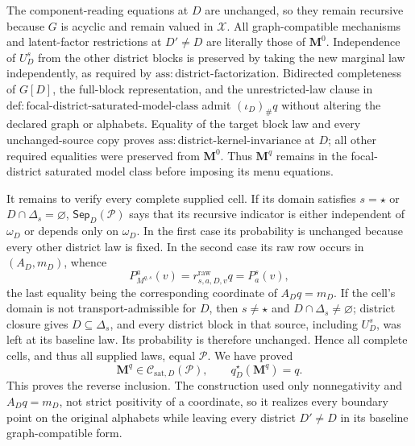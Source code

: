 The component-reading equations at \(D\) are unchanged, so they remain recursive because \(G\) is acyclic and remain valued in \(\mathcal X\).  All graph-compatible mechanisms and latent-factor restrictions at \(D'\ne D\) are literally those of \(\mathbf M^0\).  Independence of \(U_D^s\) from the other district blocks is preserved by taking the new marginal law independently, as required by \(\mathrm{ass:district\text{-}factorization}\).  Bidirected completeness of \(G[D]\), the full-block representation, and the unrestricted-law clause in \(\mathrm{def:focal\text{-}district\text{-}saturated\text{-}model\text{-}class}\) admit \((\iota_D)_\#q\) without altering the declared graph or alphabets.  Equality of the target block law and every unchanged-source copy proves \(\mathrm{ass:district\text{-}kernel\text{-}invariance}\) at \(D\); all other required equalities were preserved from \(\mathbf M^0\).  Thus \(\mathbf M^q\) remains in the focal-district saturated model class before imposing its menu equations.

It remains to verify every complete supplied cell.  If its domain satisfies \(s=\star\) or \(D\cap\Delta_s=\varnothing\), \(\mathsf{Sep}_D(\mathcal P)\) says that its recursive indicator is either independent of \(\omega_D\) or depends only on \(\omega_D\).  In the first case its probability is unchanged because every other district law is fixed.  In the second case its raw row occurs in \((A_D,m_D)\), whence
\[
P_{M^{q,s}}^a(v)
=r^{\mathrm{raw}}_{s,a,D,v}q
=P_a^s(v),
\]
the last equality being the corresponding coordinate of \(A_Dq=m_D\).  If the cell's domain is not transport-admissible for \(D\), then \(s\ne\star\) and \(D\cap\Delta_s\ne\varnothing\); district closure gives \(D\subseteq\Delta_s\), and every district block in that source, including \(U_D^s\), was left at its baseline law.  Its probability is therefore unchanged.  Hence all complete cells, and thus all supplied laws, equal \(\mathcal P\).  We have proved
\[
\mathbf M^q\in\mathcal C_{\mathrm{sat},D}(\mathcal P),
\qquad q_D^\star(\mathbf M^q)=q.
\]
This proves the reverse inclusion.  The construction used only nonnegativity and \(A_Dq=m_D\), not strict positivity of a coordinate, so it realizes every boundary point on the original alphabets while leaving every district \(D'\ne D\) in its baseline graph-compatible form.